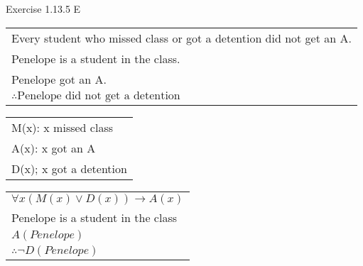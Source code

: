 \documentclass[11pt]{article}
\begin{document}
\noindent Exercise 1.13.5 E
\begin{center}
  \begin{tabular}{l}
  Every student who missed class or got a detention did not get an A.\\
  Penelope is a student in the class.\\
  Penelope got an A.\\
   \hline
  $ \therefore \text{Penelope did not get a detention}$
 \end{tabular}
\end{center}

  \begin{center}
\begin{tabular}{l}

M(x): x missed class\\
A(x): x got an A\\
D(x); x got a detention\\
\end{tabular}
\end{center}

\begin{center}
\begin{tabular}{l}
$\forall x (M(x) \vee D(x)) \rightarrow A(x)$\\
Penelope is a student in the class\\
$A(Penelope)$\\
\hline
$\therefore \neg D(Penelope)$\\
\end{tabular}
\end{center}
\end{document}

